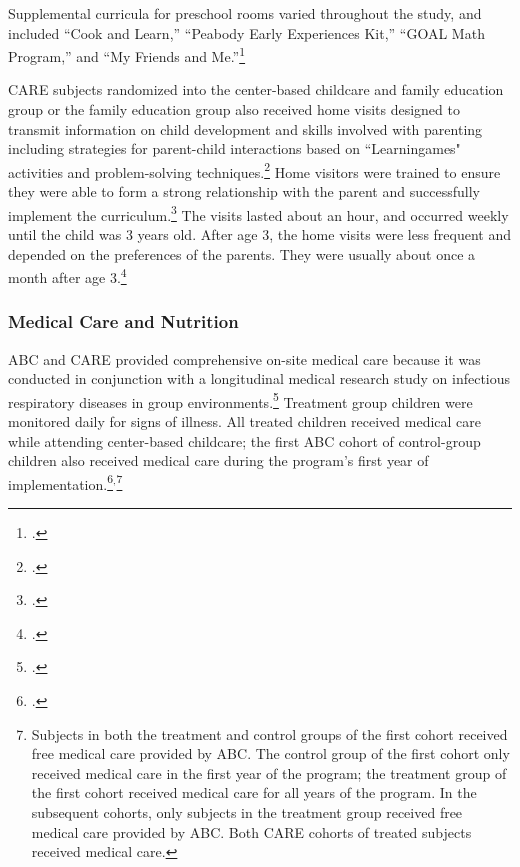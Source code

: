\begin{appendices}
\noindent Supplemental curricula for preschool rooms varied throughout the study, and included ``Cook and Learn,'' ``Peabody Early Experiences Kit,'' ``GOAL Math Program,'' and ``My Friends and Me.''\footnote{ \citet{Greenberg_Epstein_1973_BOOKBridgestoreading,Karnes1973,Dunn_Chun_etal_1976_BOOKPeabodyearlyeducation,Davis_1977_BOOKMyfriends,Wallach_1976_Teaching-All-Children}.}

\noindent CARE subjects randomized into the center-based childcare and family education group or the family education group also received home visits designed to transmit information on child development and skills involved with parenting including strategies for parent-child interactions based on ``Learningames" activities and problem-solving techniques.\footnote{\citet{Bryant_et_al_1987_Carolina_Approach_TIECSE, Wasik_Ramey_etal_1990_CD, Burchinal_Campbell_etal_1997_CD}.} Home visitors were trained to ensure they were able to form a strong relationship with the parent and successfully implement the curriculum.\footnote{\citet{Bryant_et_al_1987_Carolina_Approach_TIECSE}.} The visits lasted about an hour, and occurred weekly until the child was 3 years old. After age 3, the home visits were less frequent and depended on the preferences of the parents. They were usually about once a month after age 3.\footnote{\citet{Bryant_et_al_1987_Carolina_Approach_TIECSE, Wasik_Ramey_etal_1990_CD, Burchinal_Campbell_etal_1997_CD}.}

\subsubsection{Medical Care and Nutrition}
ABC and CARE provided comprehensive on-site medical care because it was conducted in conjunction with a longitudinal medical research study on infectious respiratory diseases in group environments.\footnote{\citet{Henderson-et-al_1982_NEJoM}.} Treatment group children were monitored daily for signs of illness. All treated children received medical care while attending center-based childcare; the first ABC cohort of control-group children also received medical care during the program's first year of implementation.\footnote{\citet{Ramey_Collier_etal_1976_CarolinaAbecedarianProject, Bryant_et_al_1987_Carolina_Approach_TIECSE, Ramey_Campbell_1991_childreninpoverty,Campbell_Ramey_1994_CD}.}$^{,}$\footnote{Subjects in both the treatment and control groups of the first cohort received free medical care provided by ABC. The control group of the first cohort only received medical care in the first year of the program; the treatment group of the first cohort received medical care for all years of the program. In the subsequent cohorts, only subjects in the treatment group received free medical care provided by ABC. Both CARE cohorts of treated subjects received medical care.}\\


\end{appendices}
